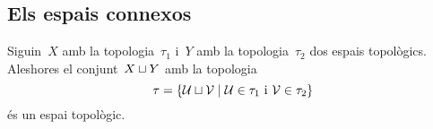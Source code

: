 \documentclass[../../main.tex]{subfiles}
\begin{document}
    \subsection{Els espais connexos}
    \begin{proposition}
        \label{prop:topologia a la unió disjunta}
        Siguin~\(X\) amb la topologia~\(\tau_{1}\) i~\(Y\) amb la topologia~\(\tau_{2}\) dos espais topològics.
        Aleshores el conjunt~\(X\mathbin{\sqcup} Y\) amb la topologia
        \begin{equation}
            \label{prop:topologia a la unió disjunta:eq1}
            \tau=\{\mathcal{U}\mathbin{\sqcup}\mathcal{V}\mid\mathcal{U}\in\tau_{1}\text{ i }\mathcal{V}\in\tau_{2}\}
        \end{equation}
        és un espai topològic.
    \end{proposition}
\end{document}
